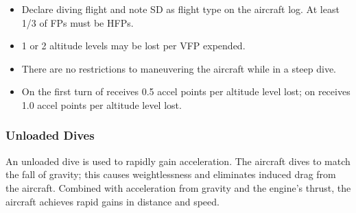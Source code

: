 \begin{itemize}

    \item{} Declare diving flight and note SD as flight type on the aircraft log. At least 1/3 of FPs must be HFPs. 

    \item{} 1 or 2 altitude levels may be lost per VFP expended.

    \item{} There are no restrictions to maneuvering the aircraft while in a steep dive.

    \item{} On the first turn of  receives 0.5 accel points per altitude level lost; on  receives 1.0 accel points per altitude level lost.

\end{itemize}

\subsubsection{Unloaded Dives}

An unloaded dive is used to rapidly gain acceleration. The aircraft dives to match the fall of gravity; this causes weightlessness and eliminates induced drag from the aircraft. Combined with acceleration from gravity and the engine's thrust, the aircraft achieves rapid gains in distance and speed.

